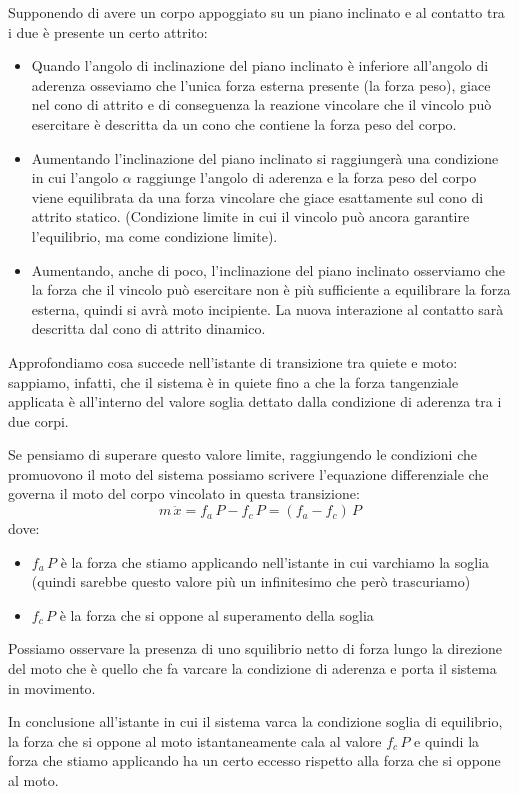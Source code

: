 Supponendo di avere un corpo appoggiato su un piano inclinato e al contatto tra i due è presente un certo attrito:
\begin{itemize}
\item Quando l'angolo di inclinazione del piano inclinato è inferiore all'angolo di aderenza osseviamo che l'unica forza esterna presente (la forza peso), giace nel cono di attrito e di conseguenza la reazione vincolare che il vincolo può esercitare è descritta da un cono che contiene la forza peso del corpo.
\item Aumentando l'inclinazione del piano inclinato si raggiungerà una condizione in cui l'angolo $\alpha$ raggiunge l'angolo di aderenza e la forza peso del corpo viene equilibrata da una forza vincolare che giace esattamente sul cono di attrito statico. (Condizione limite in cui il vincolo può ancora garantire l'equilibrio, ma come condizione limite).
\item Aumentando, anche di poco, l'inclinazione del piano inclinato osserviamo che la forza che il vincolo può esercitare non è più sufficiente a equilibrare la forza esterna, quindi si avrà moto incipiente. La nuova interazione al contatto sarà descritta dal cono di attrito dinamico.
\end{itemize}

Approfondiamo cosa succede nell'istante di transizione tra quiete e moto: sappiamo, infatti, che il sistema è in quiete fino a che la forza tangenziale applicata è all'interno del valore soglia dettato dalla condizione di aderenza tra i due corpi.

Se pensiamo di superare questo valore limite, raggiungendo le condizioni che promuovono il moto del sistema possiamo scrivere l'equazione differenziale che governa il moto del corpo vincolato in questa transizione:
\[m\,\ddot{x} = f_a\,P - f_c\,P = (f_a - f_c)\,P \]
dove:
\begin{itemize}
\item $f_a\,P$ è la forza che stiamo applicando nell'istante in cui varchiamo la soglia (quindi sarebbe questo valore più un infinitesimo che però trascuriamo)
\item $f_c\,P$ è la forza che si oppone al superamento della soglia
\end{itemize}

Possiamo osservare la presenza di uno squilibrio netto di forza lungo la direzione del moto che è quello che fa varcare la condizione di aderenza e porta il sistema in movimento.

In conclusione all'istante in cui il sistema varca la condizione soglia di equilibrio, la forza che si oppone al moto istantaneamente cala al valore $f_c\,P$ e quindi la forza che stiamo applicando ha un certo eccesso rispetto alla forza che si oppone al moto.

